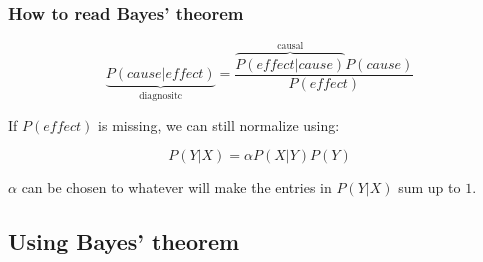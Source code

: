 \begin{frame}\frametitle{How to read Bayes' theorem}


\pause 


\pause


\begin{equation}
\underbrace{P(\mathit{cause}|\mathit{effect})}_{\text{diagnositc}} = \frac{\overbrace{P(\mathit{effect}|\mathit{cause})}^{\text{causal}}P(\mathit{cause})}{P(\mathit{effect})}
\end{equation}

If $P(\mathit{effect})$ is missing, we can still normalize using:

\begin{equation}
P(Y|X) = \alpha P(X|Y)P(Y)
\end{equation}

$\alpha$ can be chosen to whatever will make the entries in $P(Y|X)$ sum up to $1$.


\end{frame}

\newpage

\subsection{Using Bayes' theorem}

